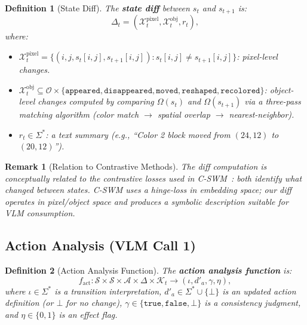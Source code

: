 \documentclass{article}
\newtheorem{definition}{Definition}
\newtheorem{remark}{Remark}
\newcommand{\calS}{\mathcal{S}}
\newcommand{\calA}{\mathcal{A}}
\newcommand{\calO}{\mathcal{O}}
\newcommand{\calK}{\mathcal{K}}
\newcommand{\calX}{\mathcal{X}}
\begin{document}
\begin{definition}[State Diff]
\label{def:diff}
The \textbf{state diff} between $s_t$ and $s_{t+1}$ is:
\begin{equation}
\Delta_t = (\calX_t^{\text{pixel}}, \calX_t^{\text{obj}}, r_t),
\end{equation}
where:
\begin{itemize}[nosep]
    \item $\calX_t^{\text{pixel}} = \{(i, j, s_t[i,j], s_{t+1}[i,j]) : s_t[i,j] \neq s_{t+1}[i,j]\}$: pixel-level changes.
    \item $\calX_t^{\text{obj}} \subseteq \calO \times \{\texttt{appeared}, \texttt{disappeared}, \texttt{moved}, \texttt{reshaped}, \texttt{recolored}\}$: object-level changes computed by comparing $\Omega(s_t)$ and $\Omega(s_{t+1})$ via a three-pass matching algorithm (color match $\to$ spatial overlap $\to$ nearest-neighbor).
    \item $r_t \in \Sigma^*$: a text summary (e.g., ``Color 2 block moved from $(24,12)$ to $(20,12)$'').
\end{itemize}
\end{definition}

\begin{remark}[Relation to Contrastive Methods]
The diff computation is conceptually related to the contrastive losses used in C-SWM~\cite{kipf2020contrastive}: both identify what changed between states.  C-SWM uses a hinge-loss in embedding space; our diff operates in pixel/object space and produces a symbolic description suitable for VLM consumption.
\end{remark}

\subsection{Action Analysis (VLM Call 1)}
\label{sec:action_analysis}

\begin{definition}[Action Analysis Function]
\label{def:action_analysis}
The \textbf{action analysis function} is:
\begin{equation}
f_{\text{act}} : \calS \times \calS \times \calA \times \Delta \times \calK_t \longrightarrow (\iota, d'_a, \gamma, \eta),
\end{equation}
where $\iota \in \Sigma^*$ is a transition interpretation, $d'_a \in \Sigma^* \cup \{\bot\}$ is an updated action definition (or $\bot$ for no change), $\gamma \in \{\texttt{true}, \texttt{false}, \bot\}$ is a consistency judgment, and $\eta \in \{0, 1\}$ is an effect flag.
\end{definition}
\end{document}
